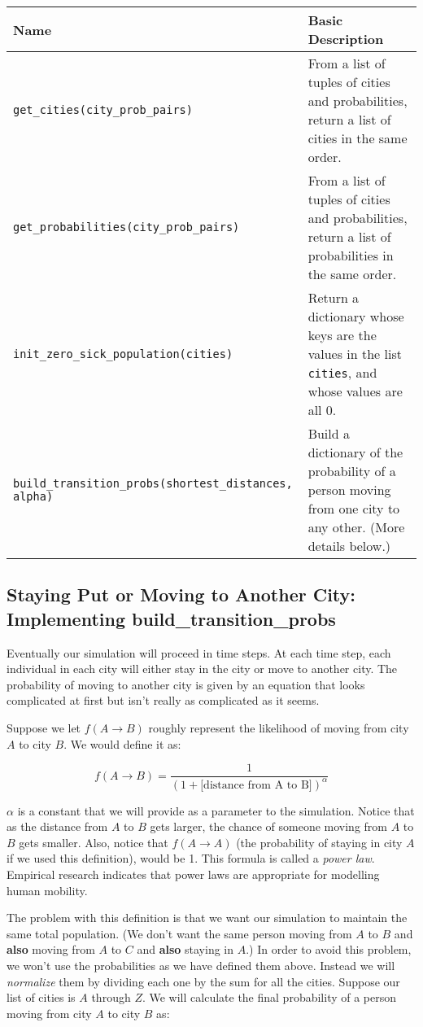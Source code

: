 \documentclass{assignment}
\begin{document}
\begin{tabular}{|l|p{8cm}|}
\hline
{\bf Name} & {\bf Basic Description} \\ \hline
\verb|get_cities(city_prob_pairs)| & From a list of tuples of cities and probabilities, return a list of cities in the same order. \\ \hline
\verb|get_probabilities(city_prob_pairs)| & From a list of tuples of cities and probabilities, return a list of probabilities in the same order. \\ \hline
\verb|init_zero_sick_population(cities)| & Return a dictionary whose keys are the values in the list \verb|cities|, and whose values are all 0. \\\hline
\verb|build_transition_probs(shortest_distances, alpha)| & Build a dictionary of the probability of a person moving from one city to any other. (More details below.)\\ \hline

\end{tabular} 




\subsection*{Staying Put or Moving to Another City:  Implementing  build\_transition\_probs}
Eventually our simulation will proceed in time steps. At each time step, each individual in each city will either stay in the city or move to another city. 
The probability of moving to another city is given by an equation that looks complicated at first
but isn't really as complicated as it seems. 

Suppose we let $f(A\rightarrow B)$ roughly represent the likelihood of moving from city $A$ to city $B$. We would define it as:

$$f(A\rightarrow B) = \frac{1}{(1+ \text{[distance from A to B]})^\alpha}$$

$\alpha$ is a constant that we will provide as a parameter to the simulation. Notice that as the distance from $A$ to $B$ gets larger, the
chance of someone moving from $A$ to $B$ gets smaller.  Also, notice that $f(A \rightarrow A)$ (the probability of staying in city $A$ if we used
this definition), would be 1. This formula is called a \textit{power law}. Empirical research\cite{gonzalez} indicates that power laws are appropriate for modelling human mobility.

The problem with this definition is that we want our simulation to maintain the same 
total population. (We don't want the same person moving from $A$ to $B$ and {\bf also} moving from $A$ to $C$ and {\bf also} staying in $A$.) In order to avoid this problem, we won't use the probabilities as we have defined them above. Instead we will \emph{normalize} them by dividing each one by the sum for all the cities. Suppose our list of cities is $A$ through $Z$. We will calculate the final probability of a person moving from city $A$ to city $B$ as:
\end{document}
